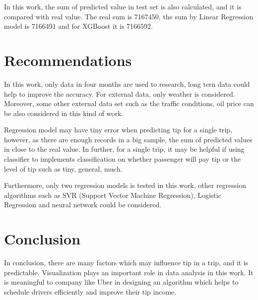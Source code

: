\documentclass[11pt]{article}
\begin{document}
In this work, the sum of predicted value in test set is also calculated, and it is compared with real value. The real sum is 7167450, the sum by Linear Regression model is 7166491 and for XGBoost it is 7166592.

\section{Recommendations}

In this work, only data in four months are used to research, long tern data could help to improve the accuracy. For external data, only weather is considered. Moreover, some other external data set such as the traffic conditions, oil price can be also considered in this kind of work.

Regression model may have tiny error when predicting tip for a single trip, however, as there are enough records in a big sample, the sum of predicted values in close to the real value. In further, for a single trip, it may be helpful if using classifier to implements classification on whether passenger will pay tip or the level of tip such as tiny, general, much.

Furthermore, only two regression models is tested in this work, other regression algorithms such as SVR (Support Vector Machine Regression), Logistic Regression and neural network could be considered.


\section{Conclusion}

In conclusion, there are many factors which may influence tip in a trip, and it is predictable. Visualization plays an important role in data analysis in this work. It is meaningful to company like Uber in designing an algorithm which helps to schedule drivers efficiently and improve their tip income. 



\clearpage

\printbibliography
\end{document}
